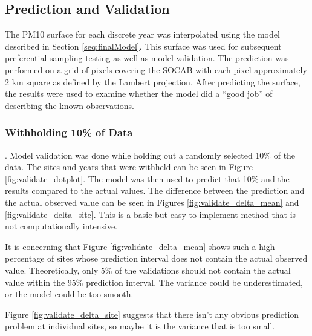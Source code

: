 \subsection{Prediction and Validation} \label{subsec:validation}
The \ac{PM10} surface for each discrete year was interpolated using the model described in Section \ref{seq:finalModel}.  This surface was used for subsequent preferential sampling testing as well as model validation.  The prediction was performed on a grid of pixels covering the \ac{SOCAB} with each pixel approximately 2 km square as defined by the Lambert projection.  After predicting the surface, the results were used to examine whether the model did a ``good job'' of describing the known observations.

\subsubsection*{Withholding 10\% of Data}
\label{subsubsec:withholding}.
Model validation was done while holding out a randomly selected 10\% of the data.  The sites and years that were withheld can be seen in Figure \ref{fig:validate_dotplot}.  The model was then used to predict that 10\% and the results compared to the actual values.  The difference between the prediction and the actual observed value can be seen in Figures \ref{fig:validate_delta_mean} and \ref{fig:validate_delta_site}.   This is a basic but easy-to-implement method that is not computationally intensive.

It is concerning that Figure \ref{fig:validate_delta_mean} shows such a high percentage of sites whose prediction interval does not contain the actual observed value.  Theoretically, only 5\% of the validations should not contain the actual value within the 95\% prediction interval.  The variance could be underestimated, or the model could be too smooth.

Figure \ref{fig:validate_delta_site} suggests that there isn't any obvious prediction problem at individual sites, so maybe it is the variance that is too small.


